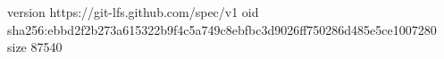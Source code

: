 version https://git-lfs.github.com/spec/v1
oid sha256:ebbd2f2b273a615322b9f4c5a749c8ebfbc3d9026ff750286d485e5ce1007280
size 87540
